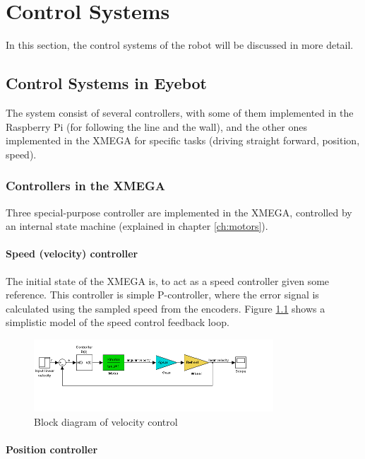 \chapter{Control Systems}

In this section, the control systems of the robot will be discussed in more detail. 

\section{Control Systems in Eyebot}

The system consist of several controllers, with some of them implemented in the Raspberry Pi (for following the line and the wall), and the other ones implemented in the XMEGA for specific tasks (driving straight forward, position, speed). 

%
%
%
%
\subsection{Controllers in the XMEGA}

Three special-purpose controller are implemented in the XMEGA, controlled by an internal state machine (explained in chapter \ref{ch:motors}).   

\subsubsection{Speed (velocity) controller}

The initial state of the XMEGA is, to act as a speed controller given some reference. This controller is simple P-controller, where the error signal is calculated using the sampled speed from the encoders. Figure \ref{fig:control_1} shows a simplistic model of the speed control feedback loop.

\begin{figure}[!ht]
	\centering
	\includegraphics[width=0.8\textwidth]{resources/speed_blockdiagram}
	\caption{Block diagram of velocity control}
	\label{fig:control_1}
\end{figure}

\subsubsection{Position controller}

